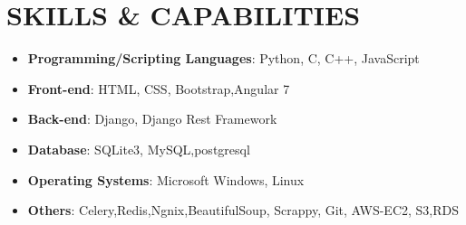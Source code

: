 \documentclass[a4paper,1pt]{article}
\begin{document}
\section{SKILLS & CAPABILITIES}
\begin{itemize}
\item \textbf{Programming/Scripting Languages}: Python, C, C++, JavaScript
\item \textbf{Front-end}: HTML, CSS, Bootstrap,Angular 7
\item \textbf{Back-end}: Django, Django Rest Framework
\item \textbf{Database}: SQLite3, MySQL,postgresql
\item \textbf{Operating Systems}: Microsoft Windows, Linux
\item \textbf{Others}: Celery,Redis,Ngnix,BeautifulSoup, Scrappy, Git, AWS-EC2, S3,RDS
\end{itemize}\bigskip\par

\end{document}
